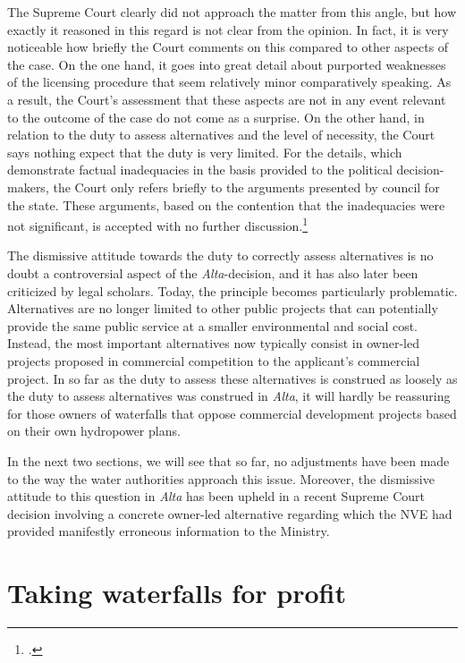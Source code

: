 The Supreme Court clearly did not approach the matter from this angle, but how exactly it reasoned in this regard is not clear from the opinion. In fact, it is very noticeable how briefly the Court comments on this compared to other aspects of the case. On the one hand, it goes into great detail about purported weaknesses of the licensing procedure that seem relatively minor comparatively speaking. As a result, the Court's assessment that these aspects are not in any event relevant to the outcome of the case do not come as a surprise. On the other hand, in relation to the duty to assess alternatives and the level of necessity, the Court says nothing expect that the duty is very limited. For the details, which demonstrate factual inadequacies in the basis provided to the political decision-makers, the Court only refers briefly to the arguments presented by council for the state. These arguments, based on the contention that the inadequacies were not significant, is accepted with no further discussion.\footcite[346]{alta82}

The dismissive attitude towards the duty to correctly assess alternatives is no doubt a controversial aspect of the {\it Alta}-decision, and it has also later been criticized by legal scholars. Today, the principle becomes particularly problematic. Alternatives are no longer limited to other public projects that can potentially provide the same public service at a smaller environmental and social cost. Instead, the most important alternatives now typically consist in owner-led projects proposed in commercial competition to the applicant's commercial project. In so far as the duty to assess these alternatives is construed as loosely as the duty to assess alternatives was construed in {\it Alta}, it will hardly be reassuring for those owners of waterfalls that oppose commercial development projects based on their own hydropower plans. 

In the next two sections, we will see that so far, no adjustments have been made to the way the water authorities approach this issue. Moreover, the dismissive attitude to this question in {\it Alta} has been upheld in a recent Supreme Court decision involving a concrete owner-led alternative regarding which the NVE had provided manifestly erroneous information to the Ministry.

\section{Taking waterfalls for profit}

